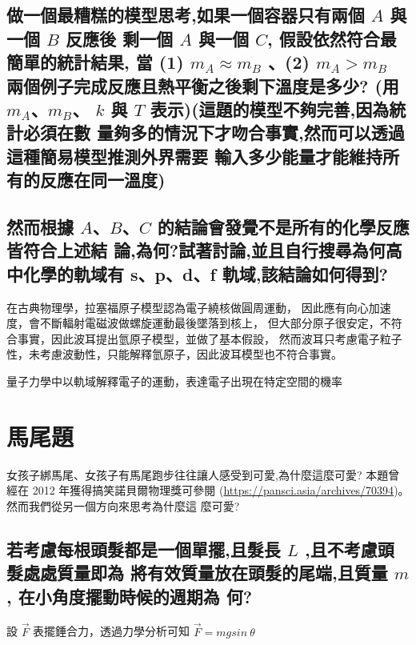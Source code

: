 \documentclass[UTF8,a4paper,12pt]{article}
\begin{document}
\subsection{做一個最糟糕的模型思考,如果一個容器只有兩個 \texorpdfstring{$A$}{A} 與
一個 \texorpdfstring{$B$}{B} 反應後
剩一個 \texorpdfstring{$A$}{A} 與一個 \texorpdfstring{$C$}{C}, 假設依然符合最簡單的統計結果, 當
(1) \texorpdfstring{$m_A ≈ m_B$}{mA ≈ mB}
、(2) \texorpdfstring{$m_A > m_B$}{mA>mB} 兩個例子完成反應且熱平衡之後剩下溫度是多少?
(用 \texorpdfstring{$m_A$}{mA}、\texorpdfstring{$m_B$}{mB}、
\texorpdfstring{$k$}{k} 與 \texorpdfstring{$T$}{T} 表示)(這題的模型不夠完善,因為統計必須在數
量夠多的情況下才吻合事實,然而可以透過這種簡易模型推測外界需要
輸入多少能量才能維持所有的反應在同一溫度)}



\subsection{然而根據 \texorpdfstring{$A$}{A}、\texorpdfstring{$B$}{B}、\texorpdfstring{$C$}{C} 的結論會發覺不是所有的化學反應皆符合上述結
論,為何?試著討論,並且自行搜尋為何高中化學的軌域有
s、p、d、f 軌域,該結論如何得到?}

在古典物理學，拉塞福原子模型認為電子繞核做圓周運動，
因此應有向心加速度，會不斷輻射電磁波做螺旋運動最後墜落到核上，
但大部分原子很安定，不符合事實，因此波耳提出氫原子模型，並做了基本假設，
然而波耳只考慮電子粒子性，未考慮波動性，只能解釋氫原子，因此波耳模型也不符合事實。

量子力學中以軌域解釋電子的運動，表達電子出現在特定空間的機率

\section{馬尾題}

女孩子綁馬尾、女孩子有馬尾跑步往往讓人感受到可愛,為什麼這麼可愛?
本題曾經在 2012 年獲得搞笑諾貝爾物理獎可參閱
(\url{https://pansci.asia/archives/70394})。然而我們從另一個方向來思考為什麼這
麼可愛?

\subsection{若考慮每根頭髮都是一個單擺,且髮長 \texorpdfstring{$L$}{L} ,且不考慮頭髮處處質量即為
將有效質量放在頭髮的尾端,且質量 \texorpdfstring{$m$}{m}, 在小角度擺動時候的週期為
何?}

設 $\vec{F}$ 表擺錘合力，透過力學分析可知 $\vec{F} = mgsin\ \theta$
\end{document}

